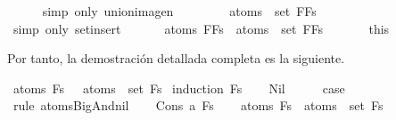 \begin{isabellebody}
\ \ \ \ \isamarkupfalse%
\ {\isacharparenleft}simp\ only{\isacharcolon}\ union{\isacharunderscore}imagen{\isacharparenright}\isanewline
\ \ \isamarkupfalse%
\ \isamarkupfalse%
\ {\isachardoublequoteopen}{\isasymdots}\ {\isacharequal}\ \ {\isasymUnion}{\isacharparenleft}atoms\ {\isacharbackquote}\ set\ {\isacharparenleft}F{\isacharhash}Fs{\isacharparenright}{\isacharparenright}{\isachardoublequoteclose}\isanewline
\ \ \ \ \isamarkupfalse%
\ {\isacharparenleft}simp\ only{\isacharcolon}\ set{\isacharunderscore}insert{\isacharparenright}\isanewline
\ \ \isamarkupfalse%
\ \isamarkupfalse%
\ \ {\isachardoublequoteopen}atoms\ {\isacharparenleft}\isactrlbold {\isasymAnd}{\isacharparenleft}F{\isacharhash}Fs{\isacharparenright}{\isacharparenright}\ {\isacharequal}\ {\isasymUnion}{\isacharparenleft}atoms\ {\isacharbackquote}\ set\ {\isacharparenleft}F{\isacharhash}Fs{\isacharparenright}{\isacharparenright}{\isachardoublequoteclose}\ \isanewline
\ \ \ \ \isamarkupfalse%
\ this\isanewline
{}\isamarkupfalse%
%
\endisatagproof
{\isafoldproof}%
%
\isadelimproof
%
\endisadelimproof
%
\begin{isamarkuptext}%
Por tanto, la demostración detallada completa es la siguiente.%
\end{isamarkuptext}\isamarkuptrue%
\isamarkupfalse%
\ {\isachardoublequoteopen}atoms\ {\isacharparenleft}\isactrlbold {\isasymAnd}Fs{\isacharparenright}\ {\isacharequal}\ {\isasymUnion}\ {\isacharparenleft}atoms\ {\isacharbackquote}\ set\ Fs{\isacharparenright}{\isachardoublequoteclose}\isanewline
%
\isadelimproof
%
\endisadelimproof
%
\isatagproof
{}\isamarkupfalse%
\ {\isacharparenleft}induction\ Fs{\isacharparenright}\isanewline
\ \ \isamarkupfalse%
\ Nil\isanewline
\ \ \isamarkupfalse%
\ \isamarkupfalse%
\ {\isacharquery}case\ \isamarkupfalse%
\ {\isacharparenleft}rule\ atoms{\isacharunderscore}BigAnd{\isacharunderscore}nil{\isacharparenright}\isanewline
{}\isamarkupfalse%
\isanewline
\ \ \isamarkupfalse%
\ {\isacharparenleft}Cons\ a\ Fs{\isacharparenright}\isanewline
\ \ \isamarkupfalse%
\ {\isachardoublequoteopen}atoms\ {\isacharparenleft}\isactrlbold {\isasymAnd}Fs{\isacharparenright}\ {\isacharequal}\ {\isasymUnion}{\isacharparenleft}atoms\ {\isacharbackquote}\ set\ Fs{\isacharparenright}{\isachardoublequoteclose}\ \isanewline
\ \ \isamarkupfalse%

\end{isabellebody}
